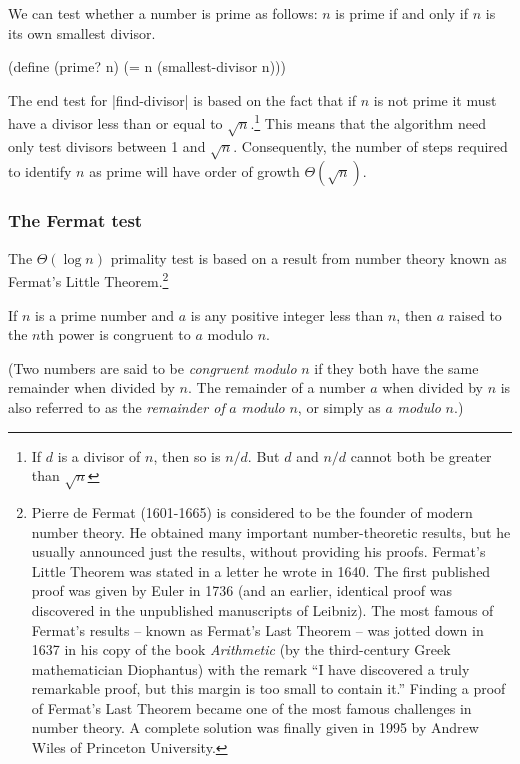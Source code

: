 We can test whether a number is prime as follows: $n$ is prime if
and only if $n$ is its own smallest divisor.

\begin{schemedisplay}
(define (prime? n)
  (= n (smallest-divisor n)))
\end{schemedisplay}

The end test for \scheme|find-divisor| is based on the fact that if
$n$ is not prime it must have a divisor less than or equal to $\sqrt
n$.\footnote{If $d$ is a divisor of $n$, then so is $n/d$.  But $d$
  and $n/d$ cannot both be greater than $\sqrt n$} This means that the
algorithm need only test divisors between 1 and $\sqrt n$.
Consequently, the number of steps required to identify $n$ as prime
will have order of growth $\Theta(\sqrt n)$.

\subsubsection*{The Fermat test}

The $\Theta(\log n)$ primality test is based on a result from number
theory known as Fermat's Little Theorem.\footnote{Pierre de Fermat
  (1601-1665) is considered to be the founder of modern number theory.
  He obtained many important number-theoretic results, but he usually
  announced just the results, without providing his proofs.  Fermat's
  Little Theorem was stated in a letter he wrote in 1640.  The first
  published proof was given by Euler in 1736 (and an earlier,
  identical proof was discovered in the unpublished manuscripts of
  Leibniz).  The most famous of Fermat's results -- known as Fermat's
  Last Theorem -- was jotted down in 1637 in his copy of the book
  \textit{Arithmetic} (by the third-century Greek mathematician
  Diophantus) with the remark ``I have discovered a truly remarkable
  proof, but this margin is too small to contain it.''  Finding a
  proof of Fermat's Last Theorem became one of the most famous
  challenges in number theory.  A complete solution was finally given
  in 1995 by Andrew Wiles of Princeton University.  }

\begin{theorem}
  If $n$ is a prime number and $a$ is any positive integer less than
  $n$, then $a$ raised to the $n$th power is congruent to $a$ modulo
  $n$.
\end{theorem}

(Two numbers are said to be \textit{congruent modulo} $n$ if
they both have the same remainder when divided by $n$.  The
remainder of a number $a$ when divided by $n$ is also referred to as
the \textit{remainder of} $a$ \textit{modulo} $n$, or simply as $a$ 
\textit{modulo} $n$.)

